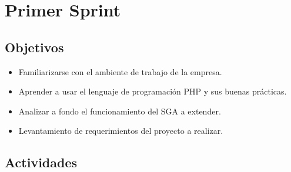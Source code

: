 ﻿\section{Primer Sprint} %
\label{sec:primer_sprint}

\subsection{Objetivos}

\begin{itemize}
	\item Familiarizarse con el ambiente de trabajo de la empresa.
	\item Aprender a usar el lenguaje de programación PHP y sus buenas prácticas.
	\item Analizar a fondo el funcionamiento del SGA a extender.
	\item Levantamiento de requerimientos del proyecto a realizar.
\end{itemize}

\subsection{Actividades} %
\label{sub:actividades1}

